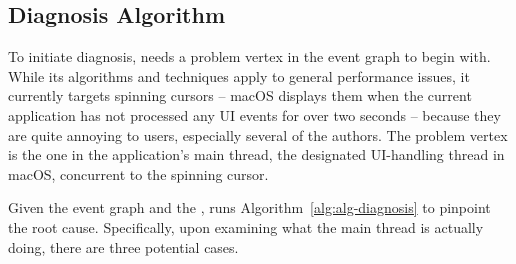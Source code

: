 \subsection{Diagnosis Algorithm} \label{subsec:debug} \label{subsec:similarvertex}

To initiate diagnosis, \xxx needs a problem vertex in the event graph to
begin with. While its algorithms and techniques apply to general
performance issues, it currently targets spinning cursors -- macOS
displays them when the current application has not processed any UI events
for over two seconds -- because they are quite annoying to users,
especially several of the authors.  The problem vertex is the one in the
application's main thread, the designated UI-handling thread in macOS,
concurrent to the spinning cursor.



Given the event graph and the \spinningnode, \xxx runs
Algorithm~\ref{alg:alg-diagnosis} to pinpoint the root cause.  Specifically,
upon examining what the main thread is actually doing, there are three
potential cases.

